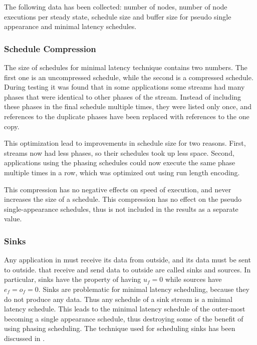 The following data has been collected: number of nodes, number of
node executions per steady state, schedule size and buffer size
for pseudo single appearance and minimal latency schedules.

\subsubsection{Schedule Compression}

The size of schedules for minimal latency technique contains two
numbers. The first one is an uncompressed schedule, while the
second is a compressed schedule. During testing it was found that
in some applications some streams had many phases that were
identical to other phases of the stream. Instead of including
these phases in the final schedule multiple times, they were
listed only once, and references to the duplicate phases have been
replaced with references to the one copy.

This optimization lead to improvements in schedule size for two
reasons. First, streams now had less phases, so their schedules
took up less space. Second, applications using the phasing
schedules could now execute the same phase multiple times in a
row, which was optimized out using run length encoding.

This compression has no negative effects on speed of execution,
and never increases the size of a schedule. This compression has
no effect on the pseudo single-appearance schedules, thus is not
included in the results as a separate value.

\subsubsection{Sinks}

Any application in {\StreamIt} must receive its data from outside,
and its data must be sent to outside. {\filters} that receive and
send data to outside are called sinks and sources. In particular,
sinks have the property of having $u_f = 0$ while sources have
$e_f = o_f = 0$. Sinks are problematic for minimal latency
scheduling, because they do not produce any data. Thus any
schedule of a sink stream is a minimal latency schedule. This
leads to the minimal latency schedule of the outer-most
{\pipeline} becoming a single appearance schedule, thus destroying
some of the benefit of using phasing scheduling. The technique
used for scheduling {\pipeline} sinks has been discussed in
\cite{karczma-thesis}.

